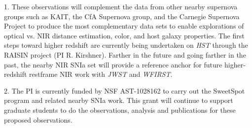 \documentclass[11pt]{article}
\begin{document}
% 
% 
%

\otherfacilities

1. These observations will complement the data from other nearby supernova groups such as KAIT, the CfA Supernova group, and the Carnegie Supernova Project to produce the most complementary data sets to enable explorations of optical vs. NIR distance estimation, color, and host galaxy properties.
The first steps toward higher redshift are currently being undertaken on {\it HST} through the RAISIN project (PI R. Kirshner).
Farther in the future and going farther in the past, the nearby NIR SNIa set will provide a reference anchor for future higher-redshift restframe NIR work with {\it JWST} and {\it WFIRST}.

2. The PI is currently funded by NSF AST-1028162 to carry out the SweetSpot program and related nearby SNIa work.  This grant will continue to support graduate students to do the observations, analysis and publications for these proposed observations.

%
%
%
%
%
\end{document}
